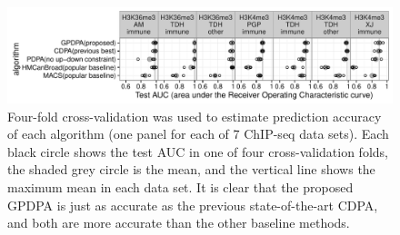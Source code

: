 \documentclass{article}
\begin{document}
\begin{figure}[b!]
  \centering
  \includegraphics[width=\textwidth]{figure-test-error-dots}
  \vskip -0.5cm
  \caption{Four-fold cross-validation was used to estimate prediction
    accuracy of each algorithm (one panel for each of 7 ChIP-seq data sets). 
Each black circle shows the test AUC in one of four
    cross-validation folds, the shaded grey circle is the mean, and
    the vertical line shows the maximum mean in each data set. It is
    clear that the proposed GPDPA is
    just as accurate as the previous state-of-the-art CDPA, and both are
    more accurate than the other baseline methods. 
  }
  \label{fig:test-error-dots}
\end{figure}





\end{document}
